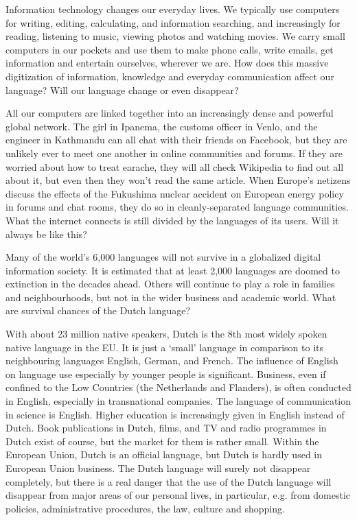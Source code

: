 \begin{multicols}{2}
Information technology changes our everyday lives. We typically use computers for writing, editing, calculating, and information searching, and increasingly for reading, listening to music, viewing photos and watching movies. We carry small computers in our pockets and use them to make phone calls, write emails, get information and entertain ourselves, wherever we are. How does this massive digitization of information, knowledge and everyday communication affect our language? Will our language change or even disappear?

All our computers are linked together into an increasingly dense and powerful global network. The girl in Ipanema, the customs officer in Venlo, and the engineer in Kathmandu can all chat with their friends on Facebook, but they are unlikely ever to meet one another in online communities and forums. If they are worried about how to treat earache, they will all check Wikipedia to find out all about it, but even then they won't read the same article. When Europe's netizens discuss the effects of the Fukushima nuclear accident on European energy policy in forums and chat rooms, they do so in cleanly-separated language communities. What the internet connects is still divided by the languages of its users. Will it always be like this?

Many of the world's 6,000 languages will not survive in a globalized digital information society. It is estimated that at least 2,000 languages are doomed to extinction in the decades ahead. Others will continue to play a role in families and neighbourhoods, but not in the wider business and academic world. What are survival chances of the Dutch language?

With about 23 million native speakers, Dutch is the 8th most widely spoken native language in the EU. It is just a `small' language in comparison to its neighbouring languages English, German, and French. The influence of English on language use especially by younger people is significant. Business, even if confined to the Low Countries (the Netherlands and Flanders), is often conducted in English, especially in transnational companies. The language of communication in science is English. Higher education is increasingly given in English instead of Dutch. Book publications in Dutch, films, and TV and radio programmes in Dutch exist of course, but the market for them is rather small.  Within the European Union, Dutch is an official language, but Dutch is hardly used in European Union business. The Dutch language will surely not disappear completely, but there is a real danger that the use of the Dutch language will disappear from major areas of our personal lives, in particular, e.g. from domestic policies, administrative procedures, the law, culture and shopping.


\end{multicols}
